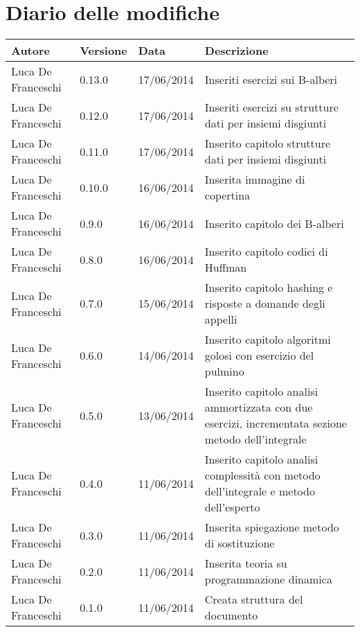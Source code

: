 \section*{Diario delle modifiche}

\begin{center}

	\begin{table}[htpd]
		\begin{tabular}{| l | l | l | p{50mm} |}
			\hline
			\hline
			\textbf{Autore} & \textbf{Versione} & \textbf{Data} & \textbf{Descrizione} \\
			\hline
			\hline
			Luca De Franceschi & 0.13.0 & 17/06/2014 & Inseriti esercizi sui B-alberi \\ \hline 
			Luca De Franceschi & 0.12.0 & 17/06/2014 & Inseriti esercizi su strutture dati per insiemi disgiunti \\ \hline
			Luca De Franceschi & 0.11.0 & 17/06/2014 & Inserito capitolo strutture dati per insiemi disgiunti \\ \hline
			Luca De Franceschi & 0.10.0 & 16/06/2014 & Inserita immagine di copertina \\ \hline
			Luca De Franceschi & 0.9.0 & 16/06/2014 & Inserito capitolo dei B-alberi \\ \hline
			Luca De Franceschi & 0.8.0 & 16/06/2014 & Inserito capitolo codici di Huffman \\ \hline
			Luca De Franceschi & 0.7.0 & 15/06/2014 & Inserito capitolo hashing e risposte a domande degli appelli \\ \hline
			Luca De Franceschi & 0.6.0 & 14/06/2014 & Inserito capitolo algoritmi golosi con esercizio del pulmino \\ \hline
			Luca De Franceschi & 0.5.0 & 13/06/2014 & Inserito capitolo analisi ammortizzata con due esercizi, incrementata sezione metodo dell'integrale \\ \hline
			Luca De Franceschi & 0.4.0 & 11/06/2014 & Inserito capitolo analisi complessità con metodo dell'integrale e metodo dell'esperto \\ \hline
			Luca De Franceschi & 0.3.0 & 11/06/2014 & Inserita spiegazione metodo di sostituzione \\ \hline
			Luca De Franceschi & 0.2.0 & 11/06/2014 & Inserita teoria su programmazione dinamica \\ \hline
			Luca De Franceschi & 0.1.0 & 11/06/2014 & Creata struttura del documento \\ \hline
		\end{tabular}
	\end{table}
	
\end{center}